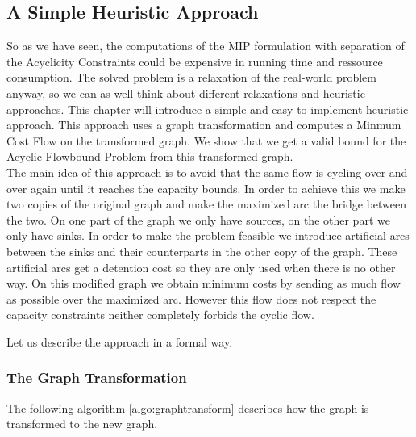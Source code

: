 \newpage
\subsection{A Simple Heuristic Approach}

So as we have seen, the computations of the MIP formulation with separation of the Acyclicity Constraints could be 
expensive in running time and ressource consumption. The solved problem is a relaxation of the real-world 
problem anyway, so we can as well think 
about different relaxations and heuristic approaches. This chapter will introduce a simple and easy to 
implement heuristic approach. This approach uses a graph transformation and computes a Minmum Cost Flow on the 
transformed graph. We show that we get a valid bound for the Acyclic Flowbound Problem from this transformed graph.\\

The main idea of this approach is to avoid that the same flow is cycling over and over again until it reaches the 
capacity bounds. In order to achieve this we make two copies of the original graph and make the maximized arc the 
bridge between the two. On one part of the graph we only have sources, on the other part we only have sinks. 
In order to make the problem feasible we introduce artificial arcs between the sinks and their counterparts in the other 
copy of the graph. These artificial arcs get a detention cost so they are only used when there is no other way. On this 
modified graph we obtain minimum costs by sending as much flow as possible over the maximized arc. However this flow 
does not respect the capacity constraints neither completely forbids the cyclic flow. 

Let us describe the approach in a formal way.

\subsubsection*{The Graph Transformation}

The following algorithm \ref{algo:graphtransform} describes how the graph is transformed to the new graph.

